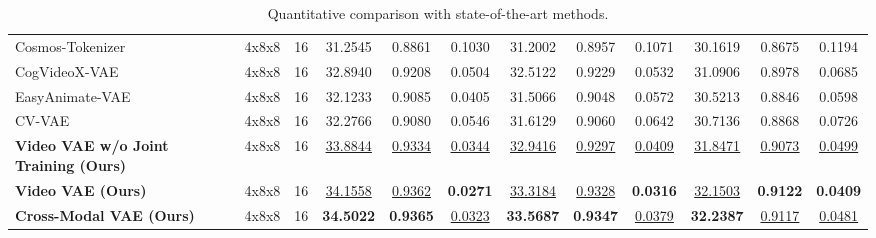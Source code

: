 \begin{table}[ht]
{\begin{tabular}{lccccccccccc}
            \midrule
            Cosmos-Tokenizer~\cite{cosmos_token} & 4x8x8 & 16 & 31.2545 & 0.8861 & 0.1030 & 31.2002 & 0.8957 & 0.1071 & 30.1619 & 0.8675 & 0.1194 \\
            CogVideoX-VAE~\cite{yang2024cogvideox} & 4x8x8 & 16 & 32.8940 & 0.9208 & 0.0504 & 32.5122 & 0.9229 & 0.0532 & 31.0906 & 0.8978 & 0.0685 \\
            EasyAnimate-VAE~\cite{xu2024easyanimatehighperformancelongvideo} & 4x8x8 & 16 & 32.1233 & 0.9085 & 0.0405 & 31.5066 & 0.9048 & 0.0572 & 30.5213 & 0.8846 & 0.0598 \\
            CV-VAE~\cite{zhao2024cv} & 4x8x8 & 16 & 32.2766 & 0.9080 & 0.0546 & 31.6129 & 0.9060 & 0.0642 & 30.7136 & 0.8868 & 0.0726 \\
            \textbf{Video VAE w/o Joint Training (Ours)} & 4x8x8 & 16 & \underline{\underline{33.8844}} & \underline{\underline{0.9334}} & \underline{\underline{0.0344}} & \underline{\underline{32.9416}} & \underline{\underline{0.9297}} & \underline{\underline{0.0409}} & \underline{\underline{31.8471}} & \underline{\underline{0.9073}} & \underline{\underline{0.0499}} \\
            \textbf{Video VAE (Ours)} & 4x8x8 & 16 & \underline{34.1558} & \underline{0.9362} & \textbf{0.0271} & \underline{33.3184} & \underline{0.9328} & \textbf{0.0316} & \underline{32.1503} & \textbf{0.9122} & \textbf{0.0409} \\
            \textbf{Cross-Modal VAE (Ours)} & 4x8x8 & 16 & \textbf{34.5022} & \textbf{0.9365} & \underline{0.0323} & \textbf{33.5687} & \textbf{0.9347} & \underline{0.0379} & \textbf{32.2387} & \underline{0.9117} & \underline{0.0481} \\
            \bottomrule
        \end{tabular}
    }
    \caption{Quantitative comparison with state-of-the-art methods.}
    \label{tab:main}
\end{table}





